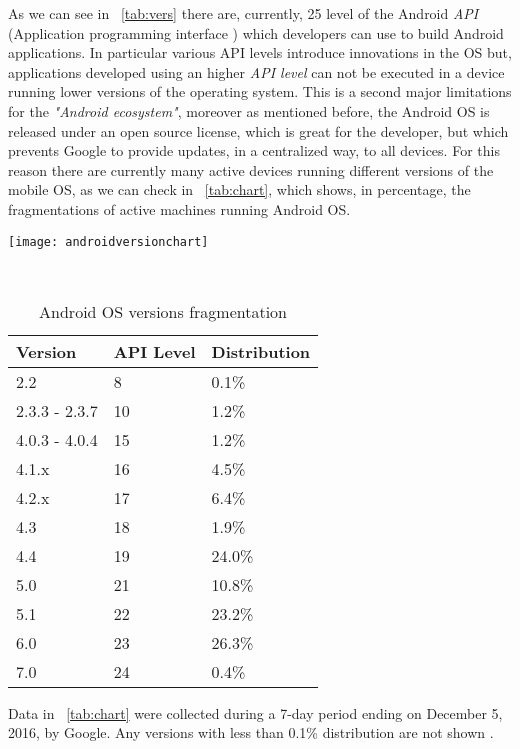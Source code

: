  As we can see in \tablename~\ref{tab:vers} there are, currently, 25 level of the Android \textit{API} (Application programming interface
 ) which developers can use to build Android applications. In particular various API levels introduce innovations in the OS but, applications developed using an higher \textit{API level} can not be executed in a device running lower versions of the operating system. This is a second major limitations for the \textit{"Android ecosystem"}, moreover as mentioned before, the Android OS is released under an open source license, which is great for the developer, but which prevents Google to provide updates, in a centralized way, to all devices. For this reason there are currently many active devices running different versions of the mobile OS, as we can check in \tablename~\ref{tab:chart}, which shows, in percentage, the fragmentations of active machines running Android OS.\\
 \begin{table}[h]
 	\caption{Android OS versions fragmentation}
 	\label{tab:chart}
 	
 	\begin{minipage}{0.5\textwidth}
 		\centering
 		\texttt{[image: androidversionchart]}
 		\label{2.2:Android fragmentation chart}
 		
 	\end{minipage}
 ~\hfill~
 \begin{minipage}{0.5 \textwidth}
 	\centering
 	\begin{tabular}{lll}
 		\toprule
 		\textbf{Version}  & \textbf{API Level} & \textbf{Distribution}\\
 		\midrule
 		2.2 & 8 & 0.1\% \\
 		2.3.3 - 2.3.7 & 10 & 1.2\% \\
 		4.0.3 - 4.0.4 & 15 & 1.2\% \\
 		4.1.x & 16 & 4.5\% \\
 		4.2.x & 17 & 6.4\% \\
 		4.3 & 18 & 1.9\% \\
 		4.4 & 19 & 24.0\% \\
 		5.0 & 21 & 10.8\% \\
 		5.1 & 22 & 23.2\% \\
 		6.0 & 23 & 26.3\% \\
 		7.0 & 24 & 0.4\% \\
 		\bottomrule
 	\end{tabular}
\end{minipage}
 \end{table}
Data in \tablename~\ref{tab:chart} were collected during a 7-day period ending on December 5, 2016, by Google. Any versions with less than 0.1\% distribution are not shown \cite{devandroiddash}.
